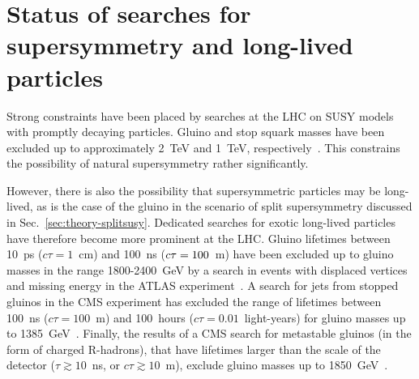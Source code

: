 \section{Status of searches for supersymmetry and long-lived particles}
\label{sec:theory-status}
Strong constraints have been placed by searches at the LHC on SUSY models with 
promptly decaying particles. Gluino and stop squark masses have been excluded 
up to approximately 2~TeV and 1~TeV, 
respectively~\cite{mt236,ra2b36,stop0L36,stop1L36,stop2L36}. 
This constrains the possibility of natural supersymmetry rather significantly.

However, there is also the possibility that supersymmetric particles may be 
long-lived, as is the case of the gluino in the scenario of split supersymmetry 
discussed in Sec.~\ref{sec:theory-splitsusy}. Dedicated searches for exotic 
long-lived particles have therefore become more prominent at the LHC. Gluino 
lifetimes between 10~ps ($c\tau=1$~cm) and 100~ns ($c\tau=100$~m) have been 
excluded up to gluino masses in the range 1800-2400~GeV by a search in events 
with displaced vertices and missing energy in the ATLAS 
experiment~\cite{dispvert-atlas}. A search for jets from stopped gluinos in the 
CMS experiment has excluded the range of lifetimes between 100~ns 
($c\tau=100$~m) and 100~hours ($c\tau=0.01$~light-years) for gluino masses up 
to 
1385~GeV~\cite{stoppedgluino-cms}. Finally, the results of a CMS search for 
metastable gluinos (in the form of charged R-hadrons), that have lifetimes 
larger than the scale of the detector ($\tau \gtrsim 10$~ns, or $c\tau \gtrsim 
10$~m), exclude gluino masses up to 1850~GeV~\cite{hscp-cms}.

